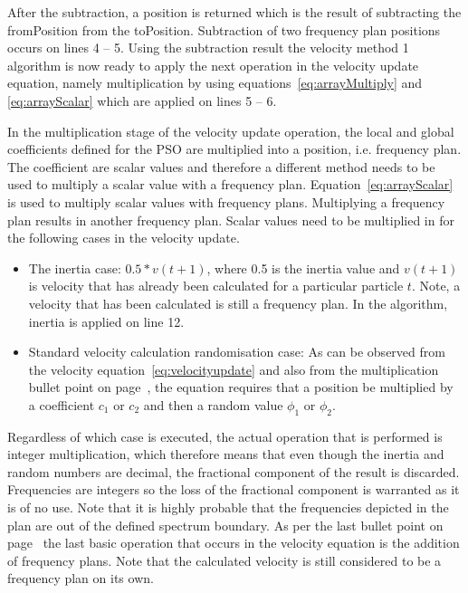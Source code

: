 After the subtraction, a position is returned which is the result of subtracting the fromPosition from the toPosition. Subtraction of two frequency plan positions occurs on lines 4 -- 5. Using the subtraction result the velocity method 1 algorithm is now ready to apply the next operation in the velocity update equation, namely multiplication by using equations~\ref{eq:arrayMultiply} and \ref{eq:arrayScalar} which are applied on lines 5 -- 6.

In the multiplication stage of the velocity update operation, the local and global coefficients defined for the \gls{PSO} are multiplied into a position, i.e. frequency plan. The coefficient are scalar values and therefore a different method needs to be used to multiply a scalar value with a frequency plan. Equation~\ref{eq:arrayScalar} is used to multiply scalar values with frequency plans. Multiplying a frequency plan results in another frequency plan. Scalar values need to be multiplied in for the following cases in the velocity update.
\begin{itemize}
\item The inertia case: $0.5 * v(t+1)$, where 0.5 is the inertia value and $v(t+1)$ is velocity that has already been calculated for a particular particle $t$. Note, a velocity that has been calculated is still a frequency plan. In the algorithm, inertia is applied on line 12.
\item Standard velocity calculation randomisation case: As can be observed from the velocity equation~\ref{eq:velocityupdate} and also from the multiplication bullet point on page~\pageref{lst:velocitybreakup}, the equation requires that a position be multiplied by a coefficient $c_1$ or $c_2$ and then a random value $\phi_1$ or $\phi_2$. 
\end{itemize}

Regardless of which case is executed, the actual operation that is performed is integer multiplication, which therefore means that even though the inertia and random numbers are decimal, the fractional component of the result is discarded. Frequencies are integers so the loss of the fractional component is warranted as it is of no use. Note that it is highly probable that the frequencies depicted in the plan are out of the defined spectrum boundary. As per the last bullet point on page~\pageref{lst:velocitybreakup} the last basic operation that occurs in the velocity equation is the addition of frequency plans. Note that the calculated velocity is still considered to be a frequency plan on its own.

